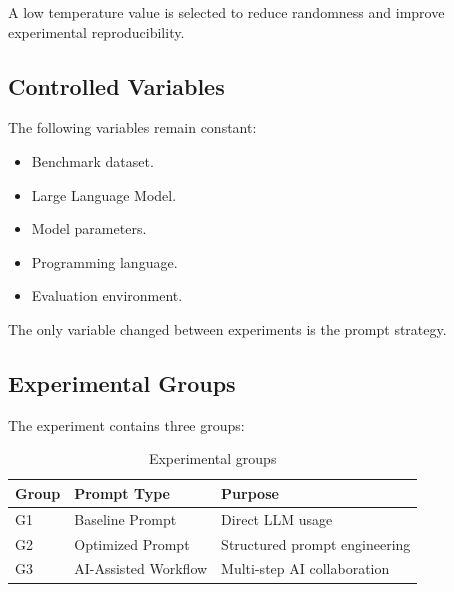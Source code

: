 A low temperature value is selected to reduce randomness and improve
experimental reproducibility.



\subsection{Controlled Variables}


The following variables remain constant:


\begin{itemize}

\item Benchmark dataset.

\item Large Language Model.

\item Model parameters.

\item Programming language.

\item Evaluation environment.

\end{itemize}


The only variable changed between experiments is the prompt strategy.



\subsection{Experimental Groups}


The experiment contains three groups:


\begin{table}[h]

\centering

\begin{tabular}{lll}

\toprule

Group & Prompt Type & Purpose \\

\midrule

G1 & Baseline Prompt & Direct LLM usage \\

G2 & Optimized Prompt & Structured prompt engineering \\

G3 & AI-Assisted Workflow & Multi-step AI collaboration \\

\bottomrule

\end{tabular}


\caption{Experimental groups}

\end{table}



